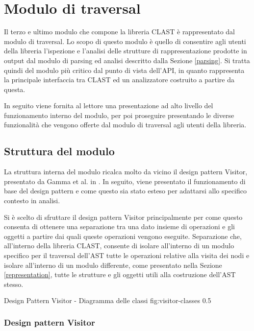 \section{Modulo di traversal}
\label{traversal}

Il terzo e ultimo modulo che compone la libreria CLAST è rappresentato dal
modulo di traversal. Lo scopo di questo modulo è quello di consentire agli
utenti della libreria l'ispezione e l'analisi delle strutture di
rappresentazione prodotte in output dal modulo di parsing ed analisi descritto
dalla Sezione \ref{parsing}. Si tratta quindi del modulo più critico dal punto
di vista dell'API, in quanto rappresenta la principale interfaccia tra CLAST ed
un analizzatore costruito a partire da questa.

In seguito viene fornita al lettore una presentazione ad alto livello del
funzionamento interno del modulo, per poi proseguire presentando le diverse
funzionalità che vengono offerte dal modulo di traversal agli utenti della
libreria.

\subsection{Struttura del modulo}

La struttura interna del modulo ricalca molto da vicino il design pattern
Visitor, presentato da Gamma et al. in \cite{gamma1995design}. In seguito, viene
presentato il funzionamento di base del design pattern e come questo sia stato
esteso per adattarsi allo specifico contesto in analisi.

Si è scelto di sfruttare il design pattern Visitor principalmente per come
questo consenta di ottenere una separazione tra una dato insieme di operazioni e
gli oggetti a partire dai quali queste operazioni vengono eseguite. Separazione
che, all'interno della libreria CLAST, consente di isolare all'interno di un
modulo specifico per il traversal dell'AST tutte le operazioni relative alla
visita dei nodi e isolare all'interno di un modulo differente, come presentato
nella Sezione \ref{representation}, tutte le strutture e gli oggetti utili alla
costruzione dell'AST stesso.

      {Design Pattern Visitor - Diagramma delle classi}
      {fig:visitor-classes}
      {0.5}

\subsubsection{Design pattern Visitor}


